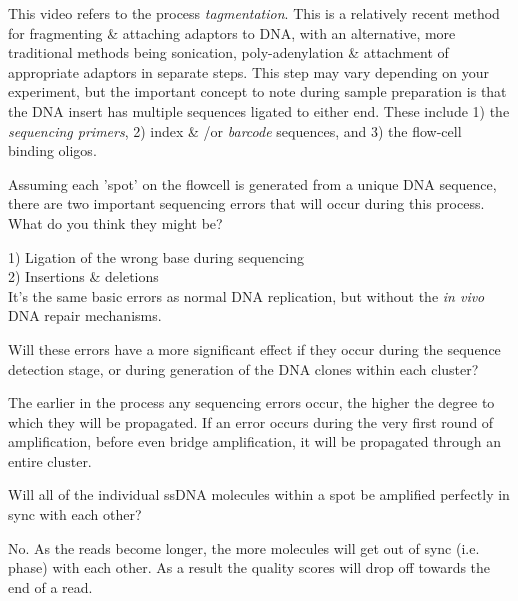 \begin{note}
This video refers to the process \textit{tagmentation}.
This is a relatively recent method for fragmenting \& attaching adaptors to DNA, with an alternative, more traditional methods being sonication, poly-adenylation \& attachment of appropriate adaptors in separate steps.
This step may vary depending on your experiment, but the important concept to note during sample preparation is that the DNA insert has multiple sequences ligated to either end.
These include 1) the \textit{sequencing primers}, 2) index \& /or \textit{barcode} sequences, and 3) the flow-cell binding oligos.
\end{note}

\begin{questions}
Assuming each 'spot' on the flowcell is generated from a unique DNA sequence, there are two important sequencing errors that will occur during this process.
What do you think they might be? \\
\begin{answer}
1) Ligation of the wrong base during sequencing \\
2) Insertions \& deletions \\
It's the same basic errors as normal DNA replication, but without the \textit{in vivo} DNA repair mechanisms.
\end{answer}

Will these errors have a more significant effect if they occur during the sequence detection stage, or during generation of the DNA clones within each cluster? \\
\begin{answer}
The earlier in the process any sequencing errors occur, the higher the degree to which they will be propagated.
If an error occurs during the very first round of amplification, before even bridge amplification, it will be propagated through an entire cluster. \\
\end{answer}

Will all of the individual ssDNA molecules within a spot be amplified perfectly in sync with each other?\\
\begin{answer}
No.  As the reads become longer, the more molecules will get out of sync (i.e. phase) with each other.
As a result the quality scores will drop off towards the end of a read.
\end{answer}
\end{questions}



